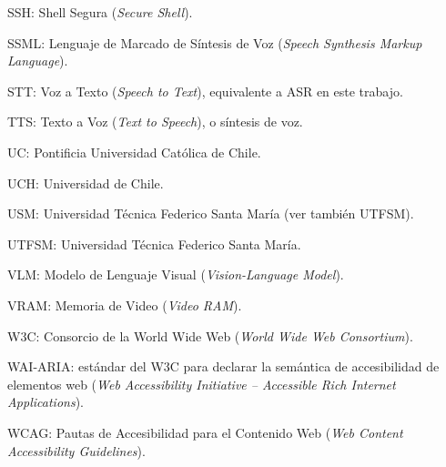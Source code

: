 {SSH: Shell Segura (\textit{Secure Shell}).

SSML: Lenguaje de Marcado de Síntesis de Voz (\textit{Speech Synthesis Markup Language}).

STT: Voz a Texto (\textit{Speech to Text}), equivalente a ASR en este trabajo.

TTS: Texto a Voz (\textit{Text to Speech}), o síntesis de voz.

UC: Pontificia Universidad Católica de Chile.

UCH: Universidad de Chile.

USM: Universidad Técnica Federico Santa María (ver también UTFSM).

UTFSM: Universidad Técnica Federico Santa María.

VLM: Modelo de Lenguaje Visual (\textit{Vision-Language Model}).

VRAM: Memoria de Video (\textit{Video RAM}).

W3C: Consorcio de la World Wide Web (\textit{World Wide Web Consortium}).

WAI-ARIA: estándar del W3C para declarar la semántica de accesibilidad de elementos web (\textit{Web Accessibility Initiative -- Accessible Rich Internet Applications}).

WCAG: Pautas de Accesibilidad para el Contenido Web (\textit{Web Content Accessibility Guidelines}).
}
